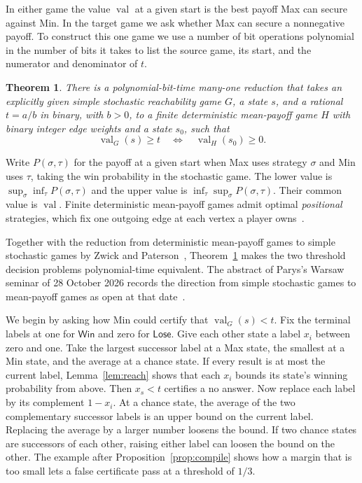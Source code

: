 \documentclass[11pt,letterpaper]{article}
\newtheorem{theorem}{Theorem}
\newcommand{\Win}{\mathsf{Win}}
\newcommand{\Lose}{\mathsf{Lose}}
\newcommand{\val}{\operatorname{val}}
\begin{document}
In either game the value \(\val\) at a given start is the best payoff Max can
secure against Min. In the target game we ask whether Max can secure a
nonnegative payoff. To construct this one game we use a number of bit operations
polynomial in the number of bits it takes to list the source game, its start,
and the numerator and denominator of \(t\).

\begin{theorem}\label{thm:main}
There is a polynomial-bit-time many-one reduction that takes an explicitly given
simple stochastic reachability game \(G\), a state \(s\), and a rational \(t=a/b\)
in binary, with \(b>0\), to a finite deterministic mean-payoff game \(H\) with
binary integer edge weights and a state \(s_0\), such that
\[
                 \val_G(s)\ge t \quad\Longleftrightarrow\quad \val_H(s_0)\ge 0 .
\]
\end{theorem}

Write \(P(\sigma,\tau)\) for the payoff at a given start when Max uses strategy
\(\sigma\) and Min uses \(\tau\), taking the win probability in the stochastic game.
The lower value is \(\sup_\sigma\inf_\tau P(\sigma,\tau)\) and the upper value is
\(\inf_\tau\sup_\sigma P(\sigma,\tau)\). Their common value is \(\val\).
Finite deterministic mean-payoff games admit optimal \emph{positional} strategies,
which fix one outgoing edge at each vertex a player owns~\cite{em,gkk}.

Together with the reduction from deterministic mean-payoff games to simple
stochastic games by Zwick and Paterson~\cite[\S\S5--6]{zp}, Theorem~\ref{thm:main}
makes the two threshold decision problems polynomial-time equivalent. The abstract
of Parys's Warsaw seminar of 28 October 2026 records the direction from simple
stochastic games to mean-payoff games as open at that date~\cite{parys}.

We begin by asking how Min could certify that \(\val_G(s)<t\). Fix the
terminal labels at one for \(\Win\) and zero for \(\Lose\). Give each other
state a label \(x_i\) between zero and one. Take the largest successor label
at a Max state, the smallest at a Min state, and the average at a chance
state. If every result is at most the current label, Lemma~\ref{lem:reach}
shows that each \(x_i\) bounds its state's winning probability from above. Then \(x_s<t\) certifies
a no answer.
Now replace each label by its complement \(1-x_i\). At a chance state, the
average of the two complementary successor labels is an upper bound on the
current label. Replacing the average by a larger number loosens the bound.
If two chance states are successors of each other, raising either label can
loosen the bound on the other. The example after Proposition~\ref{prop:compile}
shows how a margin that is too small lets a false certificate pass at a
threshold of \(1/3\).
\end{document}
